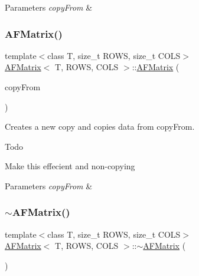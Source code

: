 \begin{DoxyParams}{Parameters}
{\em copy\+From} & \\
\hline
\end{DoxyParams}
\mbox{\label{class_a_f_matrix_adf63ea3dbdc05d678371099310993471}} 
\subsubsection{\texorpdfstring{A\+F\+Matrix()}{AFMatrix()}\hspace{0.1cm}{\footnotesize\ttfamily [3/3]}}
{\footnotesize\ttfamily template$<$class T, size\+\_\+t R\+O\+WS, size\+\_\+t C\+O\+LS$>$ \\
\hyperlink{class_a_f_matrix}{A\+F\+Matrix}$<$ T, R\+O\+WS, C\+O\+LS $>$\+::\hyperlink{class_a_f_matrix}{A\+F\+Matrix} (\begin{DoxyParamCaption}\item[{array$<$ T, R\+O\+WS $\ast$C\+O\+LS $>$ $\ast$}]{copy\+From }\end{DoxyParamCaption})\hspace{0.3cm}{\ttfamily [inline]}}

Creates a new copy and copies data from {\ttfamily copy\+From}. \begin{DoxyRefDesc}{Todo}
\item[\hyperlink{todo__todo000003}{Todo}]Make this effecient and non-\/copying \end{DoxyRefDesc}

\begin{DoxyParams}{Parameters}
{\em copy\+From} & \\
\hline
\end{DoxyParams}
\mbox{\label{class_a_f_matrix_a657752979ec2d7bad591e3def1f4bcc7}} 
\subsubsection{\texorpdfstring{$\sim$\+A\+F\+Matrix()}{~AFMatrix()}}
{\footnotesize\ttfamily template$<$class T, size\+\_\+t R\+O\+WS, size\+\_\+t C\+O\+LS$>$ \\
\hyperlink{class_a_f_matrix}{A\+F\+Matrix}$<$ T, R\+O\+WS, C\+O\+LS $>$\+::$\sim$\hyperlink{class_a_f_matrix}{A\+F\+Matrix} (\begin{DoxyParamCaption}{ }\end{DoxyParamCaption})\hspace{0.3cm}{\ttfamily [inline]}}



